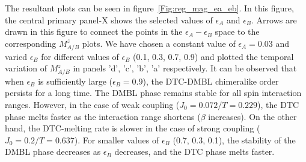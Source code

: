 \documentclass[12pt]{iopart}
\begin{document}
The resultant plots can be seen in figure~\ref{Fig:reg_mag_ea_eb}. In this figure, the central primary panel-X shows the selected values of $\epsilon_A$ and $\epsilon_B$. Arrows are drawn in this figure to connect the points in the $\epsilon_A - \epsilon_B$ space to the corresponding $M^z_{A/B}$ plots. We have chosen a constant value of $\epsilon_{A} = 0.03$ and varied $\epsilon_B$ for different values of $\epsilon_B$ (0.1, 0.3, 0.7, 0.9) and plotted the temporal variation of $M^z_{A/B}$ in panels 'd', 'c', 'b', 'a' respectively. It can be observed that when $\epsilon_B$ is sufficiently large ($\epsilon_B=0.9$), the DTC-DMBL chimeralike order persists for a long time. The DMBL phase remains stable for all spin interaction ranges. However, in the case of weak coupling ($J_0=0.072/T=0.229$), the DTC phase melts faster as the interaction range shortens ($\beta$ increases). On the other hand, the DTC-melting rate is slower in the case of strong coupling ($J_0=0.2/T=0.637$). For smaller values of $\epsilon_B$ (0.7, 0.3, 0.1), the stability of the DMBL phase decreases as $\epsilon_B$ decreases, and the DTC phase melts faster.
\end{document}
